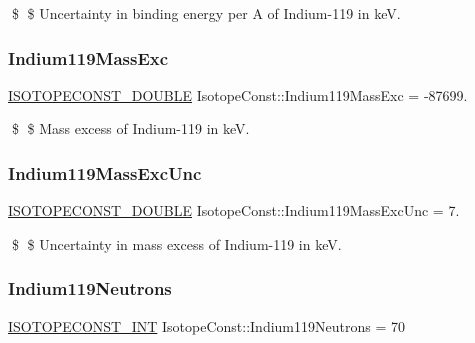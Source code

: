 \$ \$ Uncertainty in binding energy per A of Indium-\/119 in keV. \mbox{\label{group___isotope_const-_indium-_in119_ga1538d6aaa5c6cf4f4f6c9db0fdd7534f}} 
\subsubsection{\texorpdfstring{Indium119\+Mass\+Exc}{Indium119MassExc}}
{\footnotesize\ttfamily \mbox{\hyperlink{group___isotope_const-_macros_ga8f45a7272ce02c0b4c65c44636ed719a}{I\+S\+O\+T\+O\+P\+E\+C\+O\+N\+S\+T\+\_\+\+D\+O\+U\+B\+LE}} Isotope\+Const\+::\+Indium119\+Mass\+Exc = -\/87699.}

\$ \$ Mass excess of Indium-\/119 in keV. \mbox{\label{group___isotope_const-_indium-_in119_gaab4369746e6e3d85a9f8d625bdeb97c8}} 
\subsubsection{\texorpdfstring{Indium119\+Mass\+Exc\+Unc}{Indium119MassExcUnc}}
{\footnotesize\ttfamily \mbox{\hyperlink{group___isotope_const-_macros_ga8f45a7272ce02c0b4c65c44636ed719a}{I\+S\+O\+T\+O\+P\+E\+C\+O\+N\+S\+T\+\_\+\+D\+O\+U\+B\+LE}} Isotope\+Const\+::\+Indium119\+Mass\+Exc\+Unc = 7.}

\$ \$ Uncertainty in mass excess of Indium-\/119 in keV. \mbox{\label{group___isotope_const-_indium-_in119_ga00c2701c8adc7de2d20d41fa5087f6bf}} 
\subsubsection{\texorpdfstring{Indium119\+Neutrons}{Indium119Neutrons}}
{\footnotesize\ttfamily \mbox{\hyperlink{group___isotope_const-_macros_ga5f18360b3e99483a35c32d789e62621c}{I\+S\+O\+T\+O\+P\+E\+C\+O\+N\+S\+T\+\_\+\+I\+NT}} Isotope\+Const\+::\+Indium119\+Neutrons = 70}

